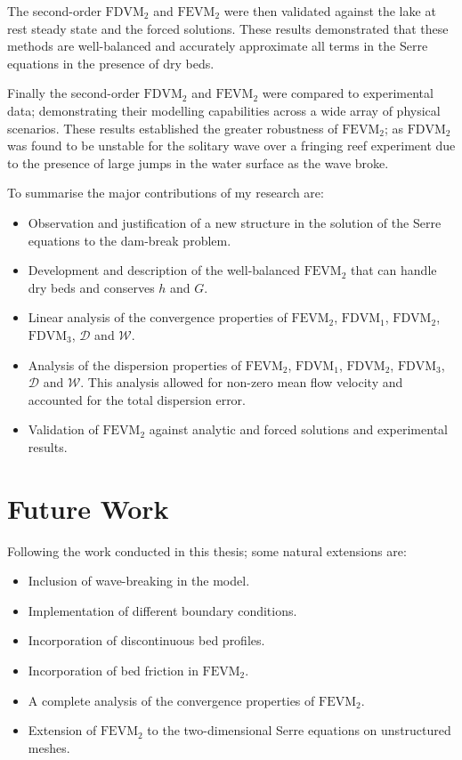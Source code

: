 The second-order $\text{FDVM}_2$ and $\text{FEVM}_2$ were then validated against the lake at rest steady state and the forced solutions. These results demonstrated that these methods are well-balanced and accurately approximate all terms in the Serre equations in the presence of dry beds. 

Finally the second-order $\text{FDVM}_2$ and $\text{FEVM}_2$ were compared to experimental data; demonstrating their modelling capabilities across a wide array of physical scenarios. These results established the greater robustness of $\text{FEVM}_2$; as $\text{FDVM}_2$ was found to be unstable for the solitary wave over a fringing reef experiment due to the presence of large jumps in the water surface as the wave broke. 

To summarise the major contributions of my research are:
\begin{itemize}
	\item Observation and justification of a new structure in the solution of the Serre equations to the dam-break problem.
	\item Development and description of the well-balanced $\text{FEVM}_2$ that can handle dry beds and conserves $h$ and $G$.
	\item Linear analysis of the convergence properties of $\text{FEVM}_2$, $\text{FDVM}_1$, $\text{FDVM}_2$, $\text{FDVM}_3$, $\mathcal{D}$ and $\mathcal{W}$.
	\item Analysis of the dispersion properties of $\text{FEVM}_2$, $\text{FDVM}_1$, $\text{FDVM}_2$, $\text{FDVM}_3$, $\mathcal{D}$ and $\mathcal{W}$. This analysis allowed for non-zero mean flow velocity and accounted for the total dispersion error.
	\item Validation of $\text{FEVM}_2$ against analytic and forced solutions and experimental results. 
\end{itemize}

\section{Future Work}
Following the work conducted in this thesis; some natural extensions are:
\begin{itemize}
	\item Inclusion of wave-breaking in the model. 
	\item Implementation of different boundary conditions.
	\item Incorporation of discontinuous bed profiles.
	\item Incorporation of bed friction in $\text{FEVM}_2$.
	\item A complete analysis of the convergence properties of $\text{FEVM}_2$.
	\item Extension of $\text{FEVM}_2$ to the two-dimensional Serre equations on unstructured meshes.
\end{itemize}




